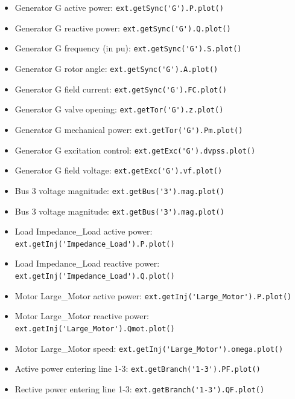\documentclass[a4paper,11pt,oneside,onecolumn]{article}
\newcommand\textcode{\Verb}
\begin{document}
\begin{itemize}
	\item Generator G active power: 	
	\textcode|ext.getSync('G').P.plot()|
	
	\item Generator G reactive power: 	
	\textcode|ext.getSync('G').Q.plot()|
	
	\item Generator G frequency (in pu): 	
	\textcode|ext.getSync('G').S.plot()|
	
	\item Generator G rotor angle: 	
	\textcode|ext.getSync('G').A.plot()|
	
	\item Generator G field current: 	
	\textcode|ext.getSync('G').FC.plot()|
		
	\item Generator G valve opening: 	
	\textcode|ext.getTor('G').z.plot()|
	
	\item Generator G mechanical power: 	
	\textcode|ext.getTor('G').Pm.plot()|
	
	\item Generator G excitation control: \textcode|ext.getExc('G').dvpss.plot()|
	
	\item Generator G field voltage: 	
	\textcode|ext.getExc('G').vf.plot()|
	
	\item Bus 3 voltage magnitude:	
	\textcode|ext.getBus('3').mag.plot()|
	
	\item Bus 3 voltage magnitude:	
	\textcode|ext.getBus('3').mag.plot()|
	
	\item Load Impedance\_Load active power: 	
	\textcode|ext.getInj('Impedance_Load').P.plot()|
	
	\item Load Impedance\_Load reactive power: 	
	\textcode|ext.getInj('Impedance_Load').Q.plot()|
	
	\item Motor Large\_Motor active power: 	
	\textcode|ext.getInj('Large_Motor').P.plot()|
	
	\item Motor Large\_Motor reactive power: 	
	\textcode|ext.getInj('Large_Motor').Qmot.plot()|
	
	\item Motor Large\_Motor speed: 	
	\textcode|ext.getInj('Large_Motor').omega.plot()|
	
	\item Active power entering line 1-3: 	
	\textcode|ext.getBranch('1-3').PF.plot()|
	
	\item Rective power entering line 1-3: 	
	\textcode|ext.getBranch('1-3').QF.plot()|
	
	
\end{itemize}
\end{document}
